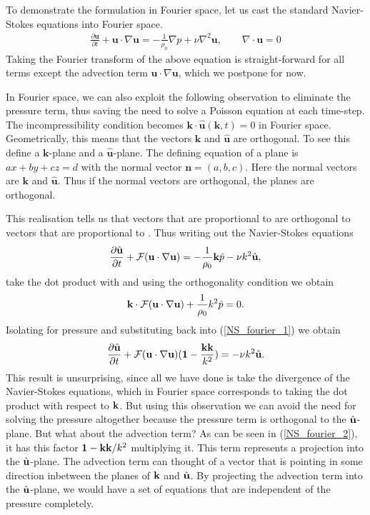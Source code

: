 To demonstrate the formulation in Fourier space, let us cast the standard Navier-Stokes equations into Fourier space. 
\begin{align}
\frac{\partial \textbf{u}}{\partial t} + \textbf{u}\cdot\nabla\textbf{u} = -\frac{1}{\rho_{0}}\nabla p + \nu\nabla^{2}\textbf{u}, \qquad \nabla\cdot\textbf{u}=0
\end{align}
Taking the Fourier transform of the above equation is straight-forward for all terms except the advection term $\textbf{u}\cdot\nabla\textbf{u}$, which we postpone for now.

In Fourier space, we can also exploit the following observation to eliminate the pressure term, thus saving the need to solve a Poisson equation at each time-step. The incompressibility condition becomes $\textbf{k}\cdot\hat{\textbf{u}}(\textbf{k},t)=0$ in Fourier space. Geometrically, this means that the vectors $\textbf{k}$ and $\hat{\textbf{u}}$ are orthogonal. To see this define a $\textbf{k}$-plane and a $\hat{\textbf{u}}$-plane. The defining equation of a plane is $ax+by+cz=d$ with the normal vector $\textbf{n}=(a,b,c)$. Here the normal vectors are $\textbf{k}$ and $\hat{\textbf{u}}$. Thus if the normal vectors are orthogonal, the planes are orthogonal.

This realisation tells us that vectors that are proportional to \uhatm are orthogonal to vectors that are proportional to \kvecm. Thus writing out the Navier-Stokes equations
\begin{align}
\frac{\partial \hat{\textbf{u}}}{\partial t} + \mathcal{F}(\textbf{u}\cdot\nabla\textbf{u}) = -\frac{1}{\rho_{0}} \textbf{k}\hat{p} - \nu k^{2}\hat{\textbf{u}}\label{NS_fourier_1},
\end{align}
take the dot product with \kvecm and using the orthogonality condition we obtain
\begin{align}
\textbf{k}\cdot\mathcal{F}(\textbf{u}\cdot\nabla\textbf{u}) + \frac{1}{\rho_{0}}k^{2}\hat{p}=0\label{pressure_fourier_1}.
\end{align}
Isolating for pressure and substituting back into (\ref{NS_fourier_1}) we obtain
\begin{align}
\frac{\partial \hat{\textbf{u}}}{\partial t} + \mathcal{F}(\textbf{u}\cdot\nabla\textbf{u})(\textbf{1}-\frac{\textbf{k}\textbf{k}}{k^{2}})= - \nu k^{2}\hat{\textbf{u}}\label{NS_fourier_2}.
\end{align}
This result is unsurprising, since all we have done is take the divergence of the Navier-Stokes equations, which in Fourier space corresponds to taking the dot product with respect to $\textbf{k}$. But using this observation we can avoid the need for solving the pressure altogether because the pressure term is orthogonal to the $\hat{\textbf{u}}$-plane. But what about the advection term? As can be seen in (\ref{NS_fourier_2}), it has this factor $\textbf{1} - \textbf{k}\textbf{k}/k^{2}$ multiplying it. This term represents a projection into the $\hat{\textbf{u}}$-plane. The advection term can thought of a vector that is pointing in some direction inbetween the planes of $\textbf{k}$ and $\hat{\textbf{u}}$. By projecting the advection term into the $\hat{\textbf{u}}$-plane, we would have a set of equations that are independent of the pressure completely.

